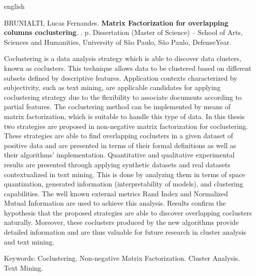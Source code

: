 \documentclass[
    12pt,                %
    oneside,            %
    a4paper,            %
    english,            %
    brazil                %
    ]{abntex2ppgsi}
\begin{document}
%
%
\begin{resumo}[Abstract]
\begin{otherlanguage*}{english}

%
%
%
%
\begin{flushleft}
BRUNIALTI, Lucas Fernandes. \textbf{Matrix Factorization for overlapping columns coclustering}. \imprimirdata. \pageref{LastPage} p. Dissertation (Master of Science) – School of Arts, Sciences and Humanities, University of São Paulo, São Paulo, DefenseYear.
\end{flushleft}

Coclustering is a data analysis strategy which is able to discover data clusters, known as coclusters.
This technique allows data to be clustered based on different subsets defined by descriptive features.
Application contexts characterized by subjectivity, such as text mining, are applicable candidates for applying coclustering strategy due to the flexibility to associate documents according to partial features.
The coclustering method can be implemented by means of matrix factorization, which is suitable to handle this type of data.
In this thesis two strategies are proposed in non-negative matrix factorization for coclustering.
These strategies are able to find overlapping coclusters in a given dataset of positive data and are presented in terms of their formal definitions as well as their algorithms' implementation.
Quantitative and qualitative experimental results are presented through applying synthetic datasets and real datasets contextualized in text mining.
This is done by analyzing them in terms of space quantization, generated information (interpretability of models), and clustering capabilities.
The well known external metrics Rand Index and Normalized Mutual Information are used to achieve this analysis.
Results confirm the hypothesis that the proposed strategies are able to discover overlapping coclusters naturally.
Moreover, these coclusters produced by the new algorithms provide detailed information and are thus valuable for future research in cluster analysis and text mining.

Keywords: Coclustering. Non-negative Matrix Factorization. Cluster Analysis. Text Mining.
\end{otherlanguage*}
\end{resumo}
\end{document}
